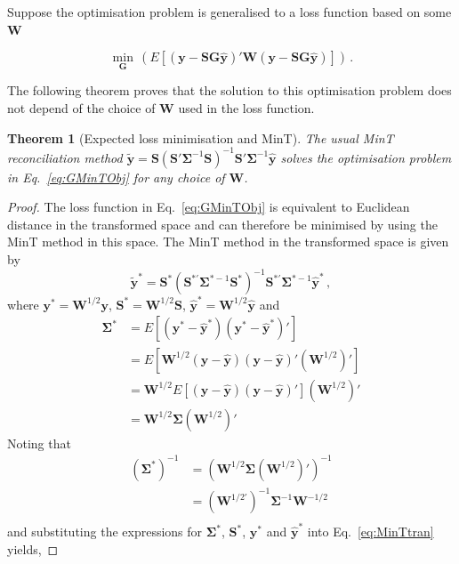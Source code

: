 \documentclass[12pt]{article}
\newtheorem{theo}{Theorem}[section]
\theoremstyle{definition}
\begin{document}
{Suppose the optimisation problem is generalised to a loss function based on some ${\bm W}$

{\color{blue}
	\begin{equation}
	\label{eq:GMinTObj}
	\underset{\bm{G}}{\min}\,(E\left[(\bm{y}-{\bm S}{\bm G}\hat{\bm{y}})'\bm{W}(\bm{y}-{\bm S}{\bm G}\hat{\bm{y}})\right])\,.
	\end{equation}
}

The following theorem proves that the solution to this optimisation problem does not depend of the choice of $\bm{W}$ used in the loss function.

\begin{theo}[Expected loss minimisation and MinT]\label{th:gmint}
    The usual MinT reconciliation method $\tilde{\bm{y}}=\bm{S}\left(\bm{S}'\bm{\Sigma}^{-1}\bm{S}\right)^{-1}\bm{S}'\bm{\Sigma}^{-1}\hat{\bm{y}}$ solves the optimisation problem in Eq.~\eqref{eq:GMinTObj} for any choice of $\bm{W}$.
\end{theo}
\begin{proof}
	The loss function in Eq.~\eqref{eq:GMinTObj} is equivalent to Euclidean distance in the transformed space and can therefore be minimised by using the MinT method in this space. The MinT method in the transformed space is given by
	\begin{equation}
	\label{eq:MinTtran}
	\tilde{\bm{y}}^{*}=\bm{S}^{*}\left(\bm{S}^{*'}\bm{\Sigma}^{*-1}\bm{S}^{*}\right)^{-1}\bm{S}^{*'}\bm{\Sigma}^{*-1}\hat{\bm{y}}^{*}\,,
	\end{equation}
	where  $\bm{y}^{*}=\bm{W}^{1/2}\bm{y}$, $\bm{S}^{*}=\bm{W}^{1/2}\bm{S}$, $\hat{\bm{y}}^{*}=\bm{W}^{1/2}\hat{\bm{y}}$ and
	\begin{align*}
	\bm{\Sigma}^*&=E\left[(\bm{y}^{*}-\hat{\bm{y}}^{*})(\bm{y}^{*}-\hat{\bm{y}}^{*})'\right]\\
	&=E\left[\bm{W}^{1/2}(\bm{y}-\hat{\bm{y}})(\bm{y}-\hat{\bm{y}})'(\bm{W}^{1/2})'\right]\\
	&=\bm{W}^{1/2}E\left[(\bm{y}-\hat{\bm{y}})(\bm{y}-\hat{\bm{y}})'\right](\bm{W}^{1/2})'\\
	&=\bm{W}^{1/2}\bm{\Sigma}(\bm{W}^{1/2})'
	\end{align*}
	Noting that
	\begin{align*}
	(\bm{\Sigma}^{*})^{-1}&=\left(\bm{W}^{1/2}\bm{\Sigma}(\bm{W}^{1/2})'\right)^{-1}\\
	&=(\bm{W}^{1/2'})^{-1}\bm{\Sigma}^{-1}\bm{W}^{-1/2}\\
	\end{align*}
	and substituting the expressions for $\bm{\Sigma}^*$, ${\bm{S}^*}$, $\bm{y}^{*}$ and $\hat{\bm{y}}^{*}$ into Eq.~\ref{eq:MinTtran} yields,

\end{proof}}
\end{document}
